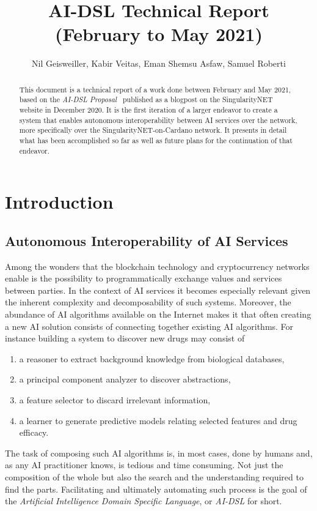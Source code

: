 \documentclass[]{report}
\begin{document}
\title{AI-DSL Technical Report (February to May 2021)}
\author{Nil Geisweiller, Kabir Veitas, Eman Shemsu Asfaw, Samuel Roberti}
\maketitle

\begin{abstract}
This document is a technical report of a work done between February
and May 2021, based on the \emph{AI-DSL
Proposal}~\cite{GoertzelGeisweillerBlog} published as a blogpost on
the SingularityNET website in December 2020.  It is the first
iteration of a larger endeavor to create a system that enables
autonomous interoperability between AI services over the network, more
specifically over the SingularityNET-on-Cardano network.  It presents
in detail what has been accomplished so far as well as future plans
for the continuation of that endeavor.
\end{abstract}

\tableofcontents

\chapter{Introduction}
\section{Autonomous Interoperability of AI Services}
Among the wonders that the blockchain technology and cryptocurrency
networks enable is the possibility to programmatically exchange values
and services between parties.  In the context of AI services it
becomes especially relevant given the inherent complexity and
decomposability of such systems.  Moreover, the abundance of AI
algorithms available on the Internet makes it that often creating a
new AI solution consists of connecting together existing AI
algorithms.  For instance building a system to discover new drugs may
consist of
\begin{enumerate}
\item a reasoner to extract background knowledge from biological
  databases,
\item a principal component analyzer to discover abstractions,
\item a feature selector to discard irrelevant information,
\item a learner to generate predictive models relating selected
  features and drug efficacy.
\end{enumerate}
The task of composing such AI algorithms is, in most cases, done by
humans and, as any AI practitioner knows, is tedious and time
consuming.  Not just the composition of the whole but also the search
and the understanding required to find the parts.  Facilitating and
ultimately automating such process is the goal of the \emph{Artificial
Intelligence Domain Specific Language}, or \emph{AI-DSL} for short.
\end{document}
